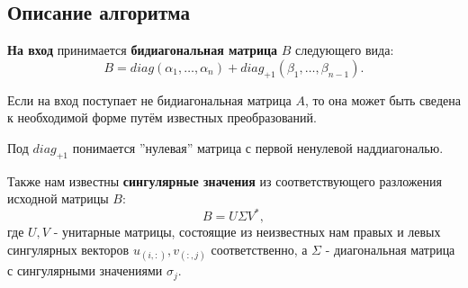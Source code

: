 


\subsection{Описание алгоритма}
\textbf{На вход} принимается \textbf{бидиагональная матрица} \(B\) следующего вида:
\[
        B= diag(\alpha_1,\dots,\alpha_n)+diag_{+1}(\beta_1,\dots,\beta_{n-1}).
\]

\begin{note}
    Если на вход поступает не бидиагональная матрица \(A\), то она может быть сведена к необходимой форме путём известных преобразований.
\end{note}

\begin{note}
    Под \(diag_{+1}\) понимается ''нулевая'' матрица с первой ненулевой наддиагональю.
\end{note}

Также нам известны \textbf{сингулярные значения} из соответствующего разложения исходной матрицы \(B\):
\begin{equation}
        B=U \Sigma V^*,
\end{equation}
где $U,V$ - унитарные матрицы, состоящие из неизвестных нам правых и левых сингулярных векторов $u_{(i,:)},v_{(:,j)}$ соответственно, а $\Sigma$ - диагональная матрица с сингулярными значениями \(\sigma_j\).

